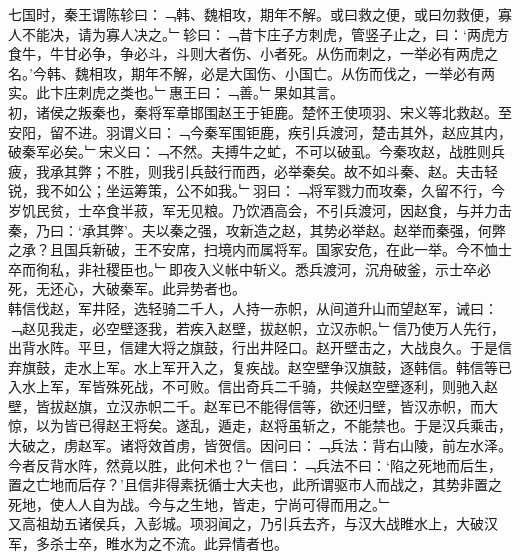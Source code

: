 七国时，秦王谓陈轸曰：﹁韩、魏相攻，期年不解。或曰救之便，或曰勿救便，寡人不能决，请为寡人决之。﹂轸曰：﹁昔卞庄子方刺虎，管竖子止之，曰：‘两虎方食牛，牛甘必争，争必斗，斗则大者伤、小者死。从伤而刺之，一举必有两虎之名。’今韩、魏相攻，期年不解，必是大国伤、小国亡。从伤而伐之，一举必有两实。此卞庄刺虎之类也。﹂惠王曰：﹁善。﹂果如其言。\\
初，诸侯之叛秦也，秦将军章邯围赵王于钜鹿。楚怀王使项羽、宋义等北救赵。至安阳，留不进。羽谓义曰：﹁今秦军围钜鹿，疾引兵渡河，楚击其外，赵应其内，破秦军必矣。﹂宋义曰：﹁不然。夫搏牛之虻，不可以破虱。今秦攻赵，战胜则兵疲，我承其弊；不胜，则我引兵鼓行而西，必举秦矣。故不如斗秦、赵。夫击轻锐，我不如公；坐运筹策，公不如我。﹂羽曰：﹁将军戮力而攻秦，久留不行，今岁饥民贫，士卒食半菽，军无见粮。乃饮酒高会，不引兵渡河，因赵食，与并力击秦，乃曰：‘承其弊’。夫以秦之强，攻新造之赵，其势必举赵。赵举而秦强，何弊之承？且国兵新破，王不安席，扫境内而属将军。国家安危，在此一举。今不恤士卒而徇私，非社稷臣也。﹂即夜入义帐中斩义。悉兵渡河，沉舟破釜，示士卒必死，无还心，大破秦军。此异势者也。
\\
韩信伐赵，军井陉，选轻骑二千人，人持一赤帜，从间道升山而望赵军，诫曰：﹁赵见我走，必空壁逐我，若疾入赵壁，拔赵帜，立汉赤帜。﹂信乃使万人先行，出背水阵。平旦，信建大将之旗鼓，行出井陉口。赵开壁击之，大战良久。于是信弃旗鼓，走水上军。水上军开入之，复疾战。赵空壁争汉旗鼓，逐韩信。韩信等已入水上军，军皆殊死战，不可败。信出奇兵二千骑，共候赵空壁逐利，则驰入赵壁，皆拔赵旗，立汉赤帜二千。赵军已不能得信等，欲还归壁，皆汉赤帜，而大惊，以为皆已得赵王将矣。遂乱，遁走，赵将虽斩之，不能禁也。于是汉兵乘击，大破之，虏赵军。诸将效首虏，皆贺信。因问曰：﹁兵法：背右山陵，前左水泽。今者反背水阵，然竟以胜，此何术也？﹂信曰：﹁兵法不曰：‘陷之死地而后生，置之亡地而后存？’且信非得素抚循士大夫也，此所谓驱市人而战之，其势非置之死地，使人人自为战。今与之生地，皆走，宁尚可得而用之。﹂\\
又高祖劫五诸侯兵，入彭城。项羽闻之，乃引兵去齐，与汉大战睢水上，大破汉军，多杀士卒，睢水为之不流。此异情者也。
\\
